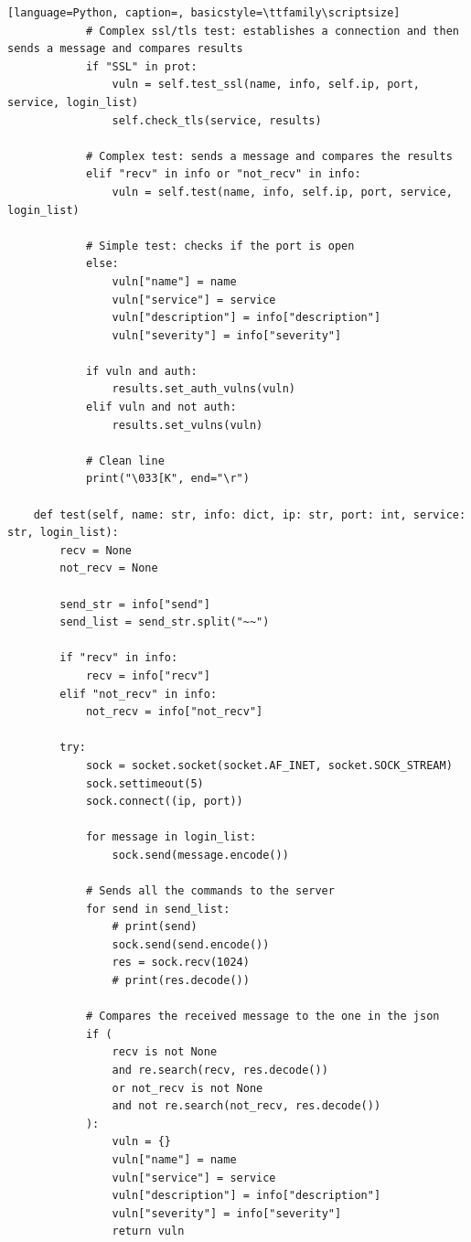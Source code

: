 \documentclass[12pt]{report}
\begin{document}
\begin{lstlisting}[language=Python, caption=, basicstyle=\ttfamily\scriptsize]
            # Complex ssl/tls test: establishes a connection and then sends a message and compares results
            if "SSL" in prot:
                vuln = self.test_ssl(name, info, self.ip, port, service, login_list)
                self.check_tls(service, results)

            # Complex test: sends a message and compares the results
            elif "recv" in info or "not_recv" in info:
                vuln = self.test(name, info, self.ip, port, service, login_list)

            # Simple test: checks if the port is open
            else:
                vuln["name"] = name
                vuln["service"] = service
                vuln["description"] = info["description"]
                vuln["severity"] = info["severity"]

            if vuln and auth:
                results.set_auth_vulns(vuln)
            elif vuln and not auth:
                results.set_vulns(vuln)

            # Clean line
            print("\033[K", end="\r")

    def test(self, name: str, info: dict, ip: str, port: int, service: str, login_list):
        recv = None
        not_recv = None

        send_str = info["send"]
        send_list = send_str.split("~~")

        if "recv" in info:
            recv = info["recv"]
        elif "not_recv" in info:
            not_recv = info["not_recv"]

        try:
            sock = socket.socket(socket.AF_INET, socket.SOCK_STREAM)
            sock.settimeout(5)
            sock.connect((ip, port))

            for message in login_list:
                sock.send(message.encode())

            # Sends all the commands to the server
            for send in send_list:
                # print(send)
                sock.send(send.encode())
                res = sock.recv(1024)
                # print(res.decode())

            # Compares the received message to the one in the json
            if (
                recv is not None
                and re.search(recv, res.decode())
                or not_recv is not None
                and not re.search(not_recv, res.decode())
            ):
                vuln = {}
                vuln["name"] = name
                vuln["service"] = service
                vuln["description"] = info["description"]
                vuln["severity"] = info["severity"]
                return vuln


\end{lstlisting}
\end{document}
